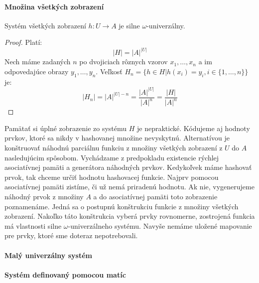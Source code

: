 \paragraph{Množina všetkých zobrazení}
\begin{remark}
Systém všetkých zobrazení $h: U \rightarrow A$ je silne $\omega$-univerzálny.
\end{remark}
\begin{proof}
Platí:
\begin{displaymath}
|H| = {|A|}^{|U|}
\end{displaymath}
Nech máme zadaných $n$ po dvojiciach rôznych vzorov $x_1, \dots, x_n$ a im odpovedajúce obrazy $y_1, \dots, y_n$. Veľkosť $H_n = \lbrace h \in H | h(x_i) = y_i, i \in \lbrace 1, \dots, n \rbrace \rbrace$ je:
\begin{displaymath}
|H_n| = {|A|}^{|U| - n} = \frac{{|A|}^{|U|}}{{|A|}^{n}} = \frac{|H|}{|A|^n}
\end{displaymath}
\end{proof}

Pamätať si úplné zobrazenie zo systému $H$ je nepraktické. Kódujeme aj hodnoty prvkov, ktoré sa nikdy v hashovanej množine nevyskytnú. Alternatívou je konštruovať náhodnú parciálnu funkciu z množiny všetkých zobrazení z $U$ do $A$ nasledujúcim spôsobom. Vychádzame z predpokladu existencie rýchlej asociatívnej pamäti a generátora náhodných prvkov. Kedykoľvek máme hashovať prvok, tak chceme určiť hodnotu hashovacej funkcie. Najprv pomocou asociatívnej pamäti zistíme, či už nemá priradenú hodnotu. Ak nie, vygenerujeme náhodný prvok z množiny $A$ a do asociatívnej pamäti toto zobrazenie poznamenáme. Jedná sa o postupnú konštrukciu funkcie z množiny všetkých zobrazení. Nakoľko táto konštrukcia vyberá prvky rovnomerne, zostrojená funkcia má vlastnosti silne $\omega$-univerzálneho systému. Navyše nemáme uložené mapovanie pre prvky, ktoré sme doteraz nepotrebovali.

\paragraph{Malý univerzálny systém}


\paragraph{Systém definovaný pomocou matíc}
